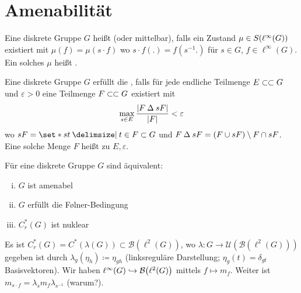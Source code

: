 \newpage

\section{Amenabilität} %
\label{sec:5}

\begin{definition}[{name=[amenabel]{von Neumann}}]
	Eine diskrete Gruppe $G$ heißt  (oder mittelbar), falls ein Zustand $\mu \in S \enbrace*{\ell^\infty(G)}$ existiert mit $\mu(f) = \mu(s \cdot f)$ wo $s \cdot f(.) = f(s^{-1} .)$ für $s \in G$, $f \in \ell^\infty(G)$.
	Ein solches $\mu$ heißt .
\end{definition}

\begin{definition}[{name=[Følner-Bedingung]}]
	Eine diskrete Gruppe $G$ erfüllt die , falls für jede endliche Teilmenge $E \finSub G$ und $\varepsilon>0$ eine Teilmenge $F \finSub G$ existiert mit 
	\[
		\max_{s \in E} \frac{\abs*{F \DeltaOp sF} }{\abs*{F}} < \varepsilon  
	\]
	wo $sF = \set*{st \given t \in F} \subset G$ und $F \DeltaOp sF = (F \cup sF) \setminus F \cap sF$.
	Eine solche Menge $F$ heißt  zu $E,\varepsilon$.
\end{definition}

\begin{satz}[label=satz:53,{name=[{Zusammenhang von amenabel und nuklear}]}]
	Für eine diskrete Gruppe $G$ sind äquivalent:
	\begin{enumerate}[(i)]
		\item $G$ ist amenabel
		\item $G$ erfüllt die Følner-Bedingung
		\item $C^*_r(G)$ ist nuklear
	\end{enumerate}
\end{satz}


\begin{erinnerung}
	Es ist $C^*_r(G) = C^*(\lambda(G)) \subset \mathcal{B}(\ell^2(G))$, wo $\lambda \colon G \to \mathcal{U}(\mathcal{B}(\ell^2(G)))$ gegeben ist durch $\lambda_g(\eta_h) \coloneqq \eta_{gh}$ (linksreguläre Darstellung; $\eta_g(t)= \delta_{gt}$ Basisvektoren).
	Wir haben $\ell^\infty(G) \hookrightarrow \mathcal{B} \enbrace*{\ell^2(G)}$ mittels $f \mapsto m_f$.
	Weiter ist $m_{s \cdot f} = \lambda_s m_f \lambda_{s^{-1}}$ (warum?).
\end{erinnerung}

